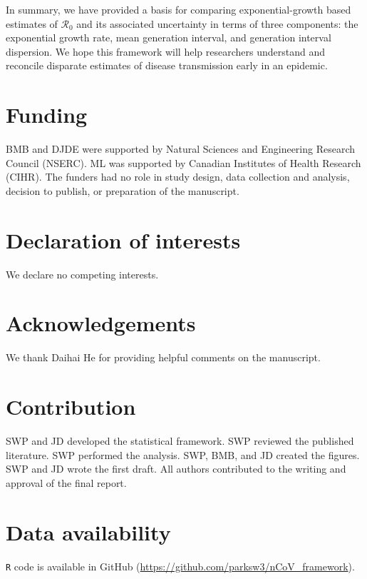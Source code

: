 \documentclass[12pt]{article}
\newcommand{\Ro}{\ensuremath{{\mathcal R}_{0}}\xspace}
\begin{document}
In summary, we have provided a basis for comparing exponential-growth based estimates of \Ro and its associated uncertainty in terms of three components: the exponential growth rate, mean generation interval, and generation interval dispersion. 
We hope this framework will help researchers understand and reconcile disparate estimates of disease transmission early in an epidemic.

\pagebreak

\section*{Funding}

BMB and DJDE were supported by Natural Sciences and Engineering Research Council (NSERC). ML was supported by Canadian Institutes of Health Research (CIHR). The funders had no role in study design, data collection and analysis, decision to publish, or preparation of the manuscript.

\section*{Declaration of interests}

We declare no competing interests.

\section*{Acknowledgements}

We thank Daihai He for providing helpful comments on the manuscript.

\section*{Contribution}

SWP and JD developed the statistical framework. 
SWP reviewed the published literature.
SWP performed the analysis. 
SWP, BMB, and JD created the figures. 
SWP and JD wrote the first draft.
All authors contributed to the writing and approval of the final report.

\section*{Data availability}

\texttt{R} code is available in GitHub (\url{https://github.com/parksw3/nCoV_framework}).


\pagebreak
\end{document}
